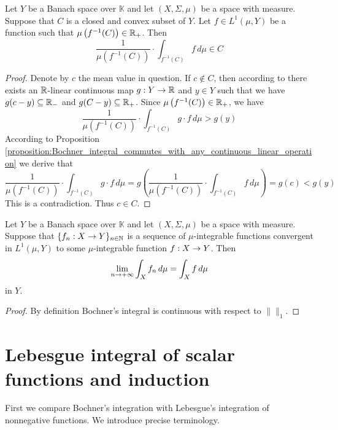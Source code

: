 \begin{proposition}\label{proposition:if_function_admit_values_in_convex_set_then_the_mean_value_is_also_in_that_set}
    Let $Y$ be a Banach space over $\mathbb{K}$ and let $(X,\Sigma,\mu)$ be a space with measure. Suppose that $C$ is a closed and convex subset of $Y$. Let $f \in L^1(\mu,Y)$ be a function such that $\mu\left(f^{-1}(C)\right) \in {\mathbb R}_+$. Then
    $$\frac{1}{\mu\left(f^{-1}(C)\right)}\cdot \int_{f^{-1}(C)}f\,d\mu \in C$$
\end{proposition}
\begin{proof}
    Denote by $c$ the mean value in question. If $c \not \in C$, then according to {\cite[Theorem 7.2]{Hahn_Banach}} there exists an ${\mathbb R}$-linear continuous map $g:Y\rightarrow {\mathbb R}$ and $y \in Y$ such that we have $g(c - y) \subseteq {\mathbb R}_-$ and $g(C - y)\subseteq {\mathbb R}_+$. Since $\mu\left(f^{-1}(C)\right) \in {\mathbb R}_+$, we have
    $$\frac{1}{\mu\left(f^{-1}(C)\right)}\cdot \int_{f^{-1}(C)} g\cdot f\,d\mu > g(y)$$
    According to Proposition \ref{proposition:Bochner_integral_commutes_with_any_continuous_linear_operation} we derive that
    $$\frac{1}{\mu\left(f^{-1}(C)\right)}\cdot \int_{f^{-1}(C)} g\cdot f\,d\mu = g\left(\frac{1}{\mu\left(f^{-1}(C)\right)}\cdot \int_{f^{-1}(C)}f\,d\mu\right) = g(c) < g(y)$$
    This is a contradiction. Thus $c \in C$.
\end{proof}


\begin{corollary}\label{corollary:convergence_of_integral}
    Let $Y$ be a Banach space over $\mathbb{K}$ and let $(X,\Sigma,\mu)$ be a space with measure. Suppose that $\{f_n:X\rightarrow Y\}_{n\in {\mathbb N}}$ is a sequence of $\mu$-integrable functions convergent in $L^1(\mu, Y)$ to some $\mu$-integrable function $f:X\rightarrow Y$. Then
    $$\lim_{n\rightarrow +\infty}\int_Xf_n\,d\mu = \int_Xf\,d\mu$$
    in $Y$.
\end{corollary}
\begin{proof}
    By definition Bochner's integral is continuous with respect to $\lVert \rVert_1$.
\end{proof}




\section{Lebesgue integral of scalar functions and induction}
\noindent
First we compare Bochner's integration with Lebesgue's integration of nonnegative functions. We introduce precise terminology.

